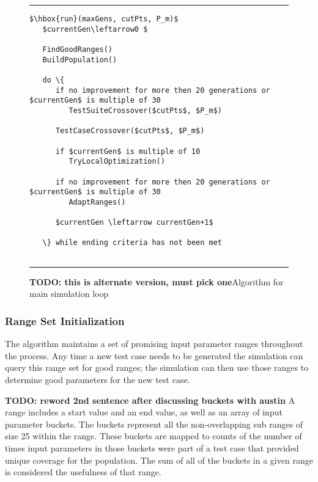 \documentclass[runningheads]{llncs}
\begin{document}
\begin{figure}[h!]
\begin{center}
\hrule
\medskip
\begin{Verbatim}[fontfamily=tt, xleftmargin=10pt, commandchars=\\\{\},
        codes={\catcode`$=3\catcode`^=7\catcode`_=8}]
$\hbox{run}(maxGens, cutPts, P_m)$
   $currentGen\leftarrow0 $
   
   FindGoodRanges()
   BuildPopulation()
   
   do \{
      if no improvement for more then 20 generations or $currentGen$ is multiple of 30
         TestSuiteCrossover($cutPts$, $P_m$) 

      TestCaseCrossover($cutPts$, $P_m$)
      
      if $currentGen$ is multiple of 10
         TryLocalOptimization()
         
      if no improvement for more then 20 generations or $currentGen$ is multiple of 30
         AdaptRanges() 
         
      $currentGen \leftarrow currentGen+1$

   \} while ending criteria has not been met
   
\end{Verbatim}
\hrule
\end{center}
\caption{\textbf{TODO: this is alternate version, must pick one}Algorithm for main simulation loop \label{fig:simLoopAlt}}
\end{figure}

\FloatBarrier
\subsubsection{Range Set Initialization}
The algorithm maintains a set of promising input parameter ranges throughout the process. Any time a new test case needs to be generated the simulation can query this range set for good ranges; the simulation can then use those ranges to determine good parameters for the new test case.

\textbf{TODO: reword 2nd sentence after discussing buckets with austin}
A range includes a start value and an end value, as well as an array of input parameter buckets. The buckets represent all the non-overlapping sub ranges of size 25 within the range. These buckets are mapped to counts of the number of times input parameters in those buckets were part of a test case that provided unique coverage for the population. The sum of all of the buckets in a given range is considered the usefulness of that range.  
\end{document}
